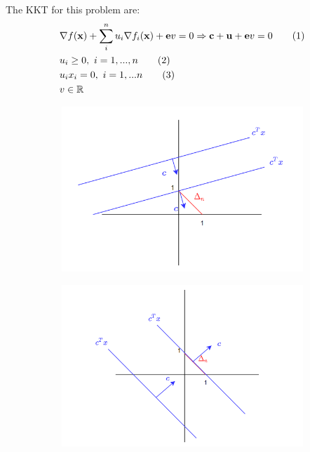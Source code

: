 \documentclass[12pt]{article}
\newcommand\numberthis{\addtocounter{equation}{1}\tag{\theequation}}	%
\begin{document}
\begin{enumerate}
\begin{enumerate}
				The KKT for this problem are:
				\begin{align*}
					&\nabla f({\bf x}) + \sum_i^n u_i\nabla f_i({\bf x}) + {\bf e}v = 0 \Rightarrow{\bf c} + {\bf u} + {\bf e}v = 0 \numberthis\\
					&u_i\geq0,\ i=1,...,n \numberthis\\
					&u_ix_i= 0,\ i=1,...n \numberthis\\
					&v\in\mathbb{R}
				\end{align*}
			
				\begin{figure}[h]
					\caption{Examples ${\bf c}^T{\bf x}$ Level Sets and the minimum on $\Delta_2$}
					\centering
					\begin{subfigure}[b]{0.4\textwidth}
						\centering
						\includegraphics[width=\textwidth]{P2-fig0.png}
					\end{subfigure}
					\begin{subfigure}[b]{0.4\textwidth}
						\centering
						\includegraphics[width=\textwidth]{P2-fig1.png}
					\end{subfigure}
				\end{figure}
				

\end{enumerate}
\end{enumerate}
\end{document}
